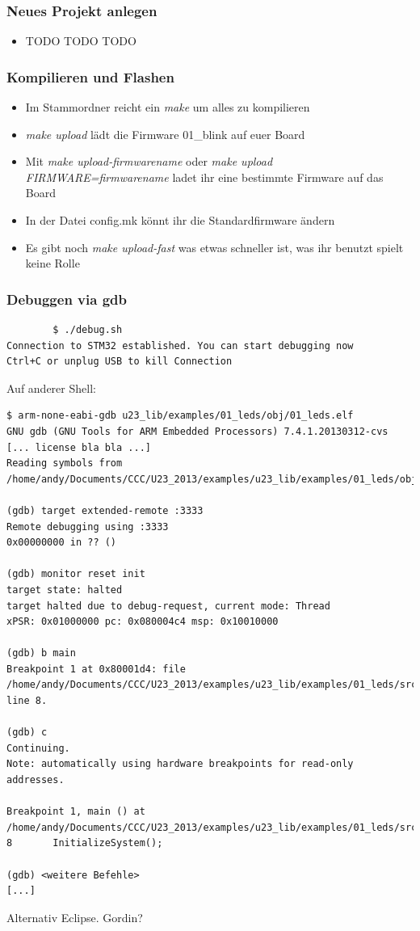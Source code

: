 \documentclass[ngerman,compress]{beamer}
\begin{document}
\begin{frame}
	\frametitle{Neues Projekt anlegen}
	\begin{itemize}
		\item TODO TODO TODO
	\end{itemize}
\end{frame}

\begin{frame}
	\frametitle{Kompilieren und Flashen}
	\begin{itemize}
		\item Im Stammordner reicht ein \emph{make} um alles zu kompilieren
		\item \emph{make upload} lädt die Firmware 01\_blink auf euer Board
		\item Mit \emph{make upload-firmwarename} oder \emph{make upload FIRMWARE=firmwarename} ladet ihr eine bestimmte Firmware auf das Board
		\item In der Datei config.mk könnt ihr die Standardfirmware ändern
		\item Es gibt noch \emph{make upload-fast} was etwas schneller ist, was ihr benutzt spielt keine Rolle
	\end{itemize}
\end{frame}

\begin{frame} [fragile]
	\frametitle{Debuggen via gdb}
		\begin{lstlisting}
		$ ./debug.sh 
Connection to STM32 established. You can start debugging now
Ctrl+C or unplug USB to kill Connection 
		\end{lstlisting}
\end{frame}

\begin{frame} [fragile]
Auf anderer Shell:
	\begin{lstlisting}
$ arm-none-eabi-gdb u23_lib/examples/01_leds/obj/01_leds.elf 
GNU gdb (GNU Tools for ARM Embedded Processors) 7.4.1.20130312-cvs
[... license bla bla ...]
Reading symbols from /home/andy/Documents/CCC/U23_2013/examples/u23_lib/examples/01_leds/obj/01_leds.elf...done.

(gdb) target extended-remote :3333
Remote debugging using :3333
0x00000000 in ?? ()

(gdb) monitor reset init
target state: halted
target halted due to debug-request, current mode: Thread 
xPSR: 0x01000000 pc: 0x080004c4 msp: 0x10010000

(gdb) b main
Breakpoint 1 at 0x80001d4: file /home/andy/Documents/CCC/U23_2013/examples/u23_lib/examples/01_leds/src/main.c, line 8.

(gdb) c
Continuing.
Note: automatically using hardware breakpoints for read-only addresses.

Breakpoint 1, main () at /home/andy/Documents/CCC/U23_2013/examples/u23_lib/examples/01_leds/src/main.c:8
8		InitializeSystem();

(gdb) <weitere Befehle> 
[...]
	\end{lstlisting}
	Alternativ Eclipse. Gordin?
\end{frame}
\end{document}
